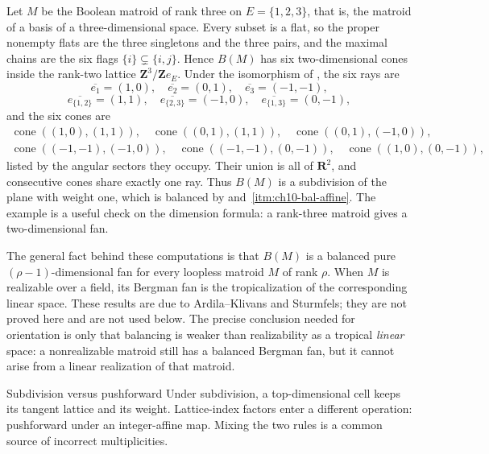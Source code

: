 \begin{example}
\label{ex:ch10-bergman-boolean}
Let $M$ be the Boolean matroid of rank three on $E=\{1,2,3\}$, that is, the
matroid of a basis of a three-dimensional space.  Every subset is a flat, so
the proper nonempty flats are the three singletons and the three pairs, and
the maximal chains are the six flags $\{i\}\subsetneq\{i,j\}$.  Hence $B(M)$
has six two-dimensional cones inside the rank-two lattice
$\mathbf Z^3/\mathbf Ze_E$.  Under the isomorphism of
, the six rays are
\[
 \overline{e_1}=(1,0),\quad
 \overline{e_2}=(0,1),\quad
 \overline{e_3}=(-1,-1),
\]
\[
 \overline{e_{\{1,2\}}}=(1,1),\quad
 \overline{e_{\{2,3\}}}=(-1,0),\quad
 \overline{e_{\{1,3\}}}=(0,-1),
\]
and the six cones are
\[
\begin{gathered}
 \operatorname{cone}((1,0),(1,1)),\quad
 \operatorname{cone}((0,1),(1,1)),\quad
 \operatorname{cone}((0,1),(-1,0)),\\
 \operatorname{cone}((-1,-1),(-1,0)),\quad
 \operatorname{cone}((-1,-1),(0,-1)),\quad
 \operatorname{cone}((1,0),(0,-1)),
\end{gathered}
\]
listed by the angular sectors they occupy.
Their union is all of $\mathbf R^2$, and consecutive cones share exactly one
ray.  Thus $B(M)$ is a subdivision of the plane with weight one, which is
balanced by  and
\,\cref{itm:ch10-bal-affine}.  The
example is a useful check on the dimension formula: a rank-three matroid
gives a two-dimensional fan.
\end{example}

The general fact behind these computations is that $B(M)$ is a balanced pure
$(\rho-1)$-dimensional fan for every loopless matroid $M$ of rank $\rho$.
When $M$ is realizable over a field, its Bergman fan is the tropicalization
of the corresponding linear space.  These results are due to Ardila--Klivans
and Sturmfels; they are not proved here and are not used below.  The precise
conclusion needed for orientation is only that balancing is weaker than
realizability as a tropical \emph{linear} space: a nonrealizable matroid still
has a balanced Bergman fan, but it cannot arise from a linear realization of
that matroid.

\begin{warning}{Subdivision versus pushforward}
Under subdivision, a top-dimensional cell keeps its tangent lattice and its
weight.  Lattice-index factors enter a different operation: pushforward under
an integer-affine map.  Mixing the two rules is a common source of incorrect
multiplicities.
\end{warning}

